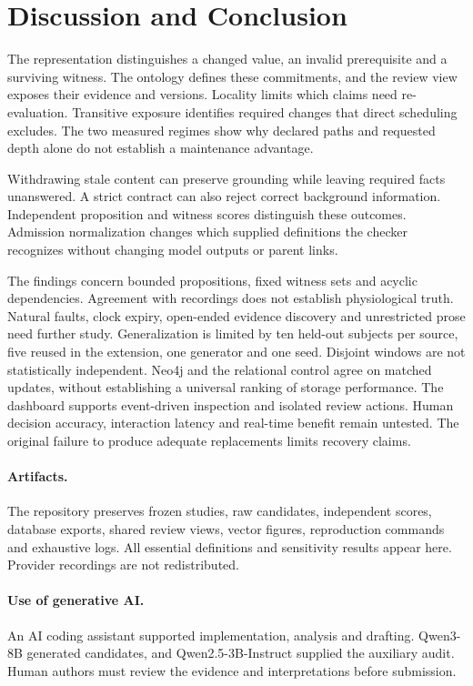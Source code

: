 \section{Discussion and Conclusion}

The representation distinguishes a changed value, an invalid prerequisite and a
surviving witness. The ontology defines these commitments,
and the review view exposes their evidence and versions. Locality limits which
claims need re-evaluation. Transitive exposure identifies required changes that
direct scheduling excludes. The two measured regimes show why declared paths
and requested depth alone do not establish a maintenance advantage.

Withdrawing stale content can preserve grounding while leaving required facts
unanswered. A strict contract can also reject correct background information.
Independent proposition and witness scores distinguish these outcomes.
Admission normalization changes which supplied definitions the checker recognizes
without changing model outputs or parent links.

The findings concern bounded propositions, fixed witness sets and acyclic
dependencies. Agreement with recordings does not establish physiological truth.
Natural faults, clock expiry, open-ended evidence discovery and unrestricted
prose need further study. Generalization is limited by ten held-out subjects per
source, five reused in the extension, one generator and one seed. Disjoint windows
are not statistically independent. Neo4j and the relational control agree on
matched updates, without establishing a universal ranking of storage performance.
The dashboard supports event-driven inspection and isolated review actions.
Human decision accuracy, interaction latency and real-time benefit remain untested.
The original failure to produce adequate replacements limits recovery claims.

\paragraph{Artifacts.}
The repository preserves frozen studies, raw candidates, independent scores,
database exports, shared review views, vector figures, reproduction commands and
exhaustive logs. All essential definitions and sensitivity results appear here.
Provider recordings are not redistributed.

\paragraph{Use of generative AI.}
An AI coding assistant supported implementation, analysis and drafting.
Qwen3-8B generated candidates, and Qwen2.5-3B-Instruct supplied the auxiliary audit.
Human authors must review the evidence and interpretations before submission.

